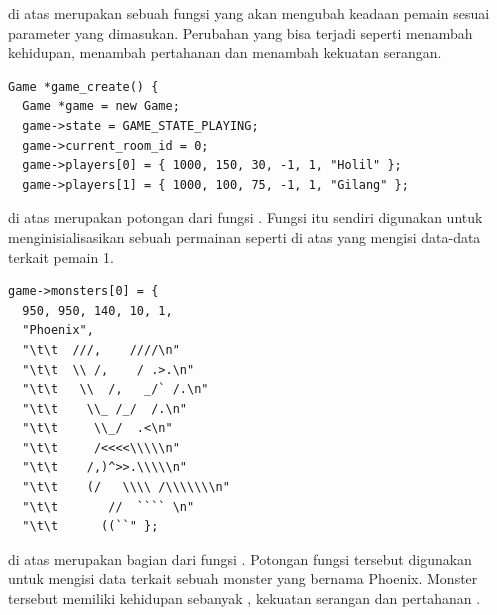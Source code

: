 \documentclass[../main.tex]{subfiles}
\begin{document}
{\Script} di atas merupakan sebuah fungsi yang akan mengubah keadaan pemain sesuai parameter  yang dimasukan. Perubahan yang bisa terjadi seperti menambah kehidupan, menambah pertahanan dan menambah kekuatan serangan.

\begin{code}
\begin{verbatim}
Game *game_create() {
  Game *game = new Game;
  game->state = GAME_STATE_PLAYING;
  game->current_room_id = 0;
  game->players[0] = { 1000, 150, 30, -1, 1, "Holil" };
  game->players[1] = { 1000, 100, 75, -1, 1, "Gilang" };
\end{verbatim}
\end{code}

{\Script} di atas merupakan potongan dari fungsi . Fungsi  itu sendiri digunakan untuk menginisialisasikan sebuah permainan seperti di atas  yang mengisi data-data terkait pemain 1.

\begin{code}
\begin{verbatim}
game->monsters[0] = {
  950, 950, 140, 10, 1,
  "Phoenix",
  "\t\t  ///,    ////\n"
  "\t\t  \\ /,    / .>.\n"
  "\t\t   \\  /,   _/` /.\n"
  "\t\t    \\_ /_/  /.\n"
  "\t\t     \\_/  .<\n"
  "\t\t     /<<<<\\\\\n"
  "\t\t    /,)^>>.\\\\\n"
  "\t\t    (/   \\\\ /\\\\\\\n"
  "\t\t       //  ```` \n"
  "\t\t      ((``" };
\end{verbatim}
\end{code}

{\Script} di atas merupakan bagian dari fungsi . Potongan fungsi tersebut digunakan untuk mengisi data terkait sebuah monster yang bernama Phoenix. Monster tersebut memiliki kehidupan sebanyak , kekuatan serangan  dan pertahanan .
\end{document}
